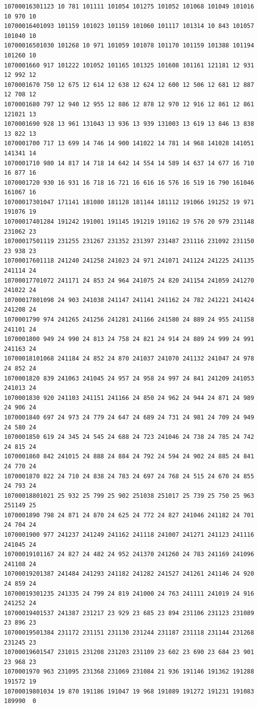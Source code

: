 \begin{lstlisting}
10700016301123 10 781 101111 101054 101275 101052 101068 101049 101016 10 970 10
10700016401093 101159 101023 101159 101060 101117 101314 10 843 101057 101040 10
10700016501030 101268 10 971 101059 101078 101170 101159 101388 101194 101260 10
1070001660 917 101222 101052 101165 101325 101608 101161 121181 12 931 12 992 12
1070001670 750 12 675 12 614 12 638 12 624 12 600 12 506 12 681 12 887 12 708 12
1070001680 797 12 940 12 955 12 886 12 878 12 970 12 916 12 861 12 861 121021 13
1070001690 928 13 961 131043 13 936 13 939 131003 13 619 13 846 13 838 13 822 13
1070001700 717 13 699 14 746 14 900 141022 14 781 14 968 141028 141051 141341 14
1070001710 980 14 817 14 718 14 642 14 554 14 589 14 637 14 677 16 710 16 877 16
1070001720 930 16 931 16 718 16 721 16 616 16 576 16 519 16 790 161046 161067 16
10700017301047 171141 181080 181128 181144 181112 191066 191252 19 971 191076 19
10700017401284 191242 191001 191145 191219 191162 19 576 20 979 231148 231062 23
10700017501119 231255 231267 231352 231397 231487 231116 231092 231150 23 938 23
10700017601118 241240 241258 241023 24 971 241071 241124 241225 241135 241114 24
10700017701072 241171 24 853 24 964 241075 24 820 241154 241059 241270 241022 24
10700017801098 24 903 241038 241147 241141 241162 24 782 241221 241424 241208 24
1070001790 974 241265 241256 241281 241166 241580 24 889 24 955 241158 241101 24
1070001800 949 24 990 24 813 24 758 24 821 24 914 24 889 24 999 24 991 241163 24
10700018101068 241184 24 852 24 870 241037 241070 241132 241047 24 978 24 852 24
1070001820 839 241063 241045 24 957 24 958 24 997 24 841 241209 241053 241013 24
1070001830 920 241103 241151 241166 24 850 24 962 24 944 24 871 24 989 24 906 24
1070001840 697 24 973 24 779 24 647 24 689 24 731 24 981 24 709 24 949 24 580 24
1070001850 619 24 345 24 545 24 688 24 723 241046 24 738 24 785 24 742 24 815 24
1070001860 842 241015 24 888 24 884 24 792 24 594 24 902 24 885 24 841 24 770 24
1070001870 822 24 710 24 838 24 783 24 697 24 768 24 515 24 670 24 855 24 793 24
10700018801021 25 932 25 799 25 902 251038 251017 25 739 25 750 25 963 251149 25
1070001890 798 24 871 24 870 24 625 24 772 24 827 241046 241182 24 701 24 704 24
1070001900 977 241237 241249 241162 241118 241007 241271 241123 241116 241045 24
10700019101167 24 827 24 482 24 952 241370 241260 24 783 241169 241096 241108 24
10700019201387 241484 241293 241182 241282 241527 241261 241146 24 920 24 859 24
10700019301235 241335 24 799 24 819 241000 24 763 241111 241019 24 916 241252 24
10700019401537 241387 231217 23 929 23 685 23 894 231106 231123 231089 23 896 23
10700019501384 231172 231151 231130 231244 231187 231118 231144 231268 231245 23
10700019601547 231015 231208 231203 231109 23 602 23 690 23 684 23 901 23 968 23
1070001970 963 231095 231368 231069 231084 21 936 191146 191362 191288 191572 19
10700019801034 19 870 191186 191047 19 968 191089 191272 191231 191083 189990  0
\end{lstlisting}



